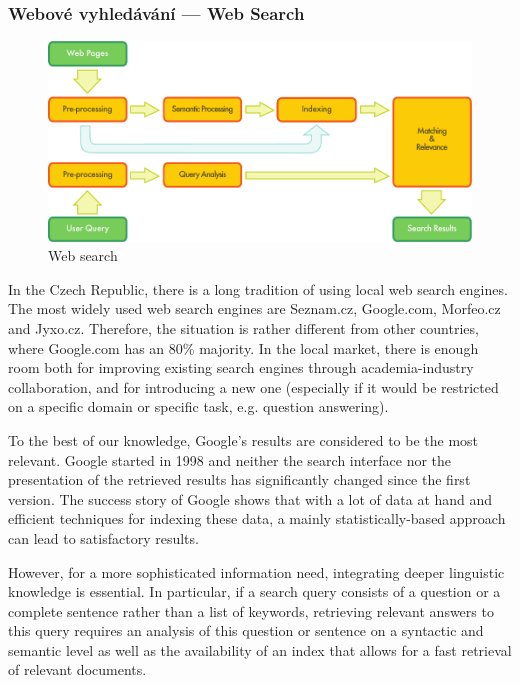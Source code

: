 \documentclass[]{../../metanetpaper}
\begin{document}
\begin{multicols}{2}
\subsubsection{Webové vyhledávání --- Web Search}

\begin{figure}[htb]
  \center
  \includegraphics[width=\textwidth]{../_media/english/web_search_architecture}
  \caption{Web search}
  \label{fig:websearcharch_en}
 \end{figure}

In the Czech Republic, there is a long tradition of using local web search engines. The most widely used web search engines are Seznam.cz, Google.com, Morfeo.cz and Jyxo.cz. Therefore, the situation is rather different from other countries, where Google.com has an 80\% majority. In the local market, there is enough room both for improving existing search engines through academia-industry collaboration, and for introducing a new one (especially if it would be restricted on a specific domain or specific task, e.g. question answering).

To the best of our knowledge, Google's results are considered to be the most relevant. Google started in 1998 and neither the search interface nor the presentation of the retrieved results has significantly changed since the first version. The success story of Google shows that with a lot of data at hand and efficient techniques for indexing these data, a mainly statistically-based approach can lead to satisfactory results.

However, for a more sophisticated information need, integrating deeper linguistic knowledge is essential. In particular, if a search query consists of a question or a complete sentence rather than a list of keywords, retrieving relevant answers to this query requires an analysis of this question or sentence on a syntactic and semantic level as well as the availability of an index that allows for a fast retrieval of relevant documents.


\end{multicols}
\end{document}
